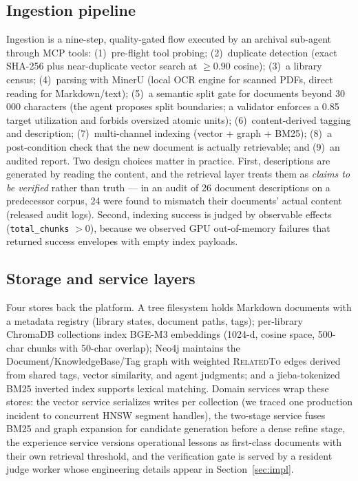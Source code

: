 \documentclass[preprint,12pt]{elsarticle}
\begin{document}
\subsection{Ingestion pipeline}
Ingestion is a nine-step, quality-gated flow executed by an archival
sub-agent through MCP tools: (1)~pre-flight tool probing; (2)~duplicate
detection (exact SHA-256 plus near-duplicate vector search at $\geq 0.90$
cosine); (3)~a library census; (4)~parsing with MinerU \cite{mineru} (local
OCR engine for scanned PDFs, direct reading for Markdown/text); (5)~a
semantic split gate for documents beyond 30\,000 characters (the agent
proposes split boundaries; a validator enforces a 0.85 target utilization
and forbids oversized atomic units); (6)~content-derived tagging and
description; (7)~multi-channel indexing (vector + graph + BM25); (8)~a
post-condition check that the new document is actually retrievable; and
(9)~an audited report. Two design choices matter in practice. First,
descriptions are generated by reading the content, and the retrieval layer
treats them as \emph{claims to be verified} rather than truth --- in an
audit of 26 document descriptions on a predecessor corpus, 24 were found to
mismatch their documents' actual content (released audit logs). Second,
indexing success is judged by observable effects (\texttt{total\_chunks}
$> 0$), because we observed GPU out-of-memory failures that returned
success envelopes with empty index payloads.

\subsection{Storage and service layers}
Four stores back the platform. A tree filesystem holds Markdown documents
with a metadata registry (library states, document paths, tags); per-library
ChromaDB collections index BGE-M3 embeddings \cite{bge-m3,chroma} (1024-d,
cosine space, 500-char chunks with 50-char overlap); Neo4j \cite{neo4j}
maintains the Document/KnowledgeBase/Tag graph with weighted
\textsc{RelatedTo} edges derived from shared tags, vector similarity, and
agent judgments; and a jieba-tokenized BM25 inverted index \cite{bm25}
supports lexical matching. Domain services wrap these stores: the vector
service serializes writes per collection (we traced one production incident
to concurrent HNSW segment handles), the two-stage service fuses BM25 and
graph expansion for candidate generation before a dense refine stage, the
experience service versions operational lessons as first-class documents
with their own retrieval threshold, and the verification gate is served by
a resident judge worker whose engineering details appear in
Section~\ref{sec:impl}.
\end{document}
